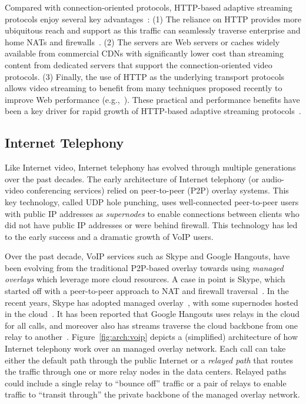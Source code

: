 Compared with connection-oriented protocols, HTTP-based adaptive streaming 
protocols enjoy several key advantages~\cite{festive}: 
(1) The reliance on HTTP provides more ubiquitous
reach and support as this traffic can seamlessly traverse enterprise and home
NATs and firewalls~\cite{httpwaist}.
(2)  The  servers are Web servers or caches widely available from commercial
CDNs with significantly lower cost than streaming content from dedicated 
servers that support the connection-oriented video protocols.
(3) Finally, the use of HTTP as the underlying transport protocols allows 
video streaming to benefit from many techniques proposed recently to improve
Web performance (e.g.,~\cite{wang2014speedy}).
These practical and performance benefits have been a key driver for rapid 
growth of HTTP-based adaptive streaming protocols~\cite{c3}.



\subsection{Internet Telephony}
\label{subsec:related:back:voip}

Like Internet video, Internet telephony has evolved through multiple 
generations over the past decades.
The early architecture of Internet telephony 
(or audio-video conferencing services) relied on peer-to-peer (P2P)
overlay systems. This key technology, called UDP hole punching, uses 
well-connected peer-to-peer users with public IP addresses 
as {\em supernodes} to enable connections between clients 
who did not have public IP addresses or were behind firewall. 
This technology has led to the early success and a dramatic
growth of VoIP users.

Over the past decade, VoIP services such as Skype and Google Hangouts, 
have been evolving from the traditional P2P-based overlay towards 
using {\em managed overlays} which leverage more cloud resources. 
A case in point is Skype, which started off with a peer-to-peer approach to NAT 
and firewall traversal~\cite{Skype-GI08}. 
In the recent years, Skype has adopted managed 
overlay~\cite{VideoTelephony-IMC12}, with some supernodes hosted in the 
cloud~\cite{Skype-Zdnet13}. 
It has been reported that Google Hangouts uses relays in the cloud for all 
calls, and moreover also has streams traverse the cloud backbone from one 
relay to another~\cite{VideoTelephony-IMC12}. 
Figure~\ref{fig:arch:voip} depicts a (simplified) architecture of how 
Internet telephony work over an managed overlay network.
Each call can take either the default path through the public Internet or
a {\em relayed path} that routes the traffic through
one or more relay nodes in the data centers. Relayed paths could include
a single relay to ``bounce off'' traffic or a pair of relays
to enable traffic to ``transit through'' the private backbone of
the managed overlay network.

